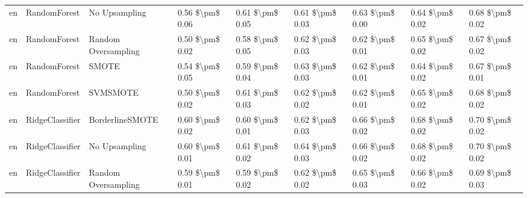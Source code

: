 \begin{tabular}{lllllllll}
      en &                    RandomForest &                 No Upsampling &     0.56 \$\textbackslash pm\$ 0.06 &           0.61 \$\textbackslash pm\$ 0.05 &       0.61 \$\textbackslash pm\$ 0.03 &        0.63 \$\textbackslash pm\$ 0.00 &                         0.64 \$\textbackslash pm\$ 0.02 &     0.68 \$\textbackslash pm\$ 0.02 \\
      en &                    RandomForest &           Random Oversampling &     0.50 \$\textbackslash pm\$ 0.02 &           0.58 \$\textbackslash pm\$ 0.05 &       0.62 \$\textbackslash pm\$ 0.03 &        0.62 \$\textbackslash pm\$ 0.01 &                         0.65 \$\textbackslash pm\$ 0.02 &     0.67 \$\textbackslash pm\$ 0.02 \\
      en &                    RandomForest &                         SMOTE &     0.54 \$\textbackslash pm\$ 0.05 &           0.59 \$\textbackslash pm\$ 0.04 &       0.63 \$\textbackslash pm\$ 0.03 &        0.62 \$\textbackslash pm\$ 0.01 &                         0.64 \$\textbackslash pm\$ 0.02 &     0.67 \$\textbackslash pm\$ 0.01 \\
      en &                    RandomForest &                      SVMSMOTE &     0.50 \$\textbackslash pm\$ 0.02 &           0.61 \$\textbackslash pm\$ 0.03 &       0.62 \$\textbackslash pm\$ 0.02 &        0.62 \$\textbackslash pm\$ 0.01 &                         0.65 \$\textbackslash pm\$ 0.02 &     0.68 \$\textbackslash pm\$ 0.02 \\
      en &                 RidgeClassifier &               BorderlineSMOTE &     0.60 \$\textbackslash pm\$ 0.02 &           0.60 \$\textbackslash pm\$ 0.01 &       0.62 \$\textbackslash pm\$ 0.03 &        0.66 \$\textbackslash pm\$ 0.02 &                         0.68 \$\textbackslash pm\$ 0.02 &     0.70 \$\textbackslash pm\$ 0.02 \\
      en &                 RidgeClassifier &                 No Upsampling &     0.60 \$\textbackslash pm\$ 0.01 &           0.61 \$\textbackslash pm\$ 0.02 &       0.64 \$\textbackslash pm\$ 0.03 &        0.66 \$\textbackslash pm\$ 0.02 &                         0.68 \$\textbackslash pm\$ 0.02 &     0.70 \$\textbackslash pm\$ 0.02 \\
      en &                 RidgeClassifier &           Random Oversampling &     0.59 \$\textbackslash pm\$ 0.01 &           0.59 \$\textbackslash pm\$ 0.02 &       0.62 \$\textbackslash pm\$ 0.02 &        0.65 \$\textbackslash pm\$ 0.03 &                         0.66 \$\textbackslash pm\$ 0.02 &     0.69 \$\textbackslash pm\$ 0.03 \\

\end{tabular}
